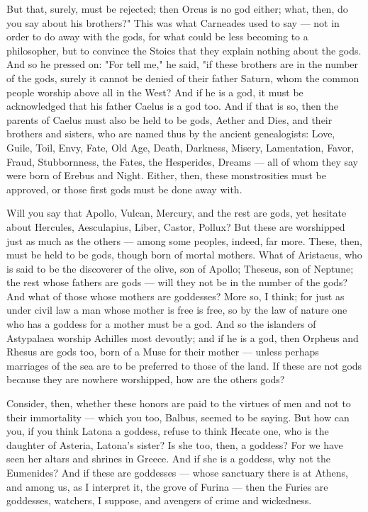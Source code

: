  But that, surely, must be rejected; then Orcus is no god either; what, then, do you say about his brothers?" This was what Carneades used to say — not in order to do away with the gods, for what could be less becoming to a philosopher, but to convince the Stoics that they explain nothing about the gods. And so he pressed on: "For tell me," he said, "if these brothers are in the number of the gods, surely it cannot be denied of their father Saturn, whom the common people worship above all in the West? And if he is a god, it must be acknowledged that his father Caelus is a god too. And if that is so, then the parents of Caelus must also be held to be gods, Aether and Dies, and their brothers and sisters, who are named thus by the ancient genealogists: Love, Guile, Toil, Envy, Fate, Old Age, Death, Darkness, Misery, Lamentation, Favor, Fraud, Stubbornness, the Fates, the Hesperides, Dreams — all of whom they say were born of Erebus and Night. Either, then, these monstrosities must be approved, or those first gods must be done away with.

 Will you say that Apollo, Vulcan, Mercury, and the rest are gods, yet hesitate about Hercules, Aesculapius, Liber, Castor, Pollux? But these are worshipped just as much as the others — among some peoples, indeed, far more. These, then, must be held to be gods, though born of mortal mothers. What of Aristaeus, who is said to be the discoverer of the olive, son of Apollo; Theseus, son of Neptune; the rest whose fathers are gods — will they not be in the number of the gods? And what of those whose mothers are goddesses? More so, I think; for just as under civil law a man whose mother is free is free, so by the law of nature one who has a goddess for a mother must be a god. And so the islanders of Astypalaea worship Achilles most devoutly; and if he is a god, then Orpheus and Rhesus are gods too, born of a Muse for their mother — unless perhaps marriages of the sea are to be preferred to those of the land. If these are not gods because they are nowhere worshipped, how are the others gods?

 Consider, then, whether these honors are paid to the virtues of men and not to their immortality — which you too, Balbus, seemed to be saying. But how can you, if you think Latona a goddess, refuse to think Hecate one, who is the daughter of Asteria, Latona's sister? Is she too, then, a goddess? For we have seen her altars and shrines in Greece. And if she is a goddess, why not the Eumenides? And if these are goddesses — whose sanctuary there is at Athens, and among us, as I interpret it, the grove of Furina — then the Furies are goddesses, watchers, I suppose, and avengers of crime and wickedness.

